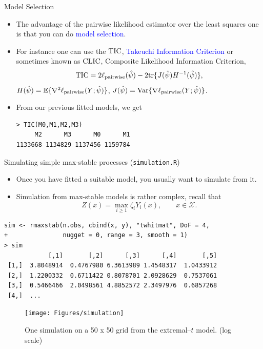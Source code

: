 \documentclass[blackslide,style=simple]{powerdot}
\theoremstyle{plain}%
\theoremstyle{definition}
\theoremstyle{remark}
\begin{document}
\begin{slide}[method=direct]{Model Selection}
  \begin{itemize}
  \item The advantage of the pairwise likelihood estimator over the
    least squares one is that you can do \textcolor{blue}{model
      selection}.
  \item For instance one can use the ${\rm TIC}$,
    \textcolor{blue}{Takeuchi Information Criterion} or sometimes
    known as ${\rm CLIC}$, Composite Likelihood Information Criterion,
    \begin{equation*}
      {\rm TIC} = 2 \ell_{\rm pairwise}(\hat \psi) - 2
      \mbox{tr}\{J(\hat \psi) H^{-1} (\hat \psi)\},
    \end{equation*}
    $H(\hat\psi) = \mathbb{E} \{\nabla^2 \ell_{\rm pairwise}(Y; \hat
    \psi) \}$, $J(\hat \psi) = \mbox{Var}\{\nabla \ell_{\rm
      pairwise}(Y; \hat\psi)\}$.
  \item From our previous fitted models, we get
{\tiny
\begin{verbatim}
> TIC(M0,M1,M2,M3)
     M2      M3      M0      M1 
1133668 1134829 1137456 1159784 
\end{verbatim}
}
  \end{itemize}
\end{slide}

\begin{slide}[toc=Simulation,method=direct]{Simulating simple max-stable processes
    (\texttt{simulation.R})}
  \begin{itemize}
  \item Once you have fitted a suitable model, you usually want to
    simulate from it.
  \item Simulation from max-stable models is rather complex, recall
    that
    \begin{equation*}
      Z(x) = \max_{i \geq 1} \zeta_i Y_i(x), \qquad x \in \mathcal{X}.
    \end{equation*}
  \end{itemize}
  \begin{minipage}[l]{.6\linewidth}
{\tiny
\begin{verbatim}
sim <- rmaxstab(n.obs, cbind(x, y), "twhitmat", DoF = 4,
+               nugget = 0, range = 3, smooth = 1)
> sim
            [,1]       [,2]      [,3]      [,4]       [,5]
 [1,]  3.8048914  0.4767980 6.3613989 1.4548317  1.0433912
 [2,]  1.2200332  0.6711422 0.8078701 2.0928629  0.7537061
 [3,]  0.5466466  2.0498561 4.8852572 2.3497976  0.6857268
 [4,]  ...
\end{verbatim}
}
  \end{minipage}
  \hfill
  \begin{minipage}[r]{.33\linewidth}
    \begin{figure}
      \centering
      \texttt{[image: Figures/simulation]}
      \caption{One simulation on a 50 x 50 grid from the extremal--$t$
        model. (log scale)}
    \end{figure}
  \end{minipage}
\end{slide}
\end{document}
